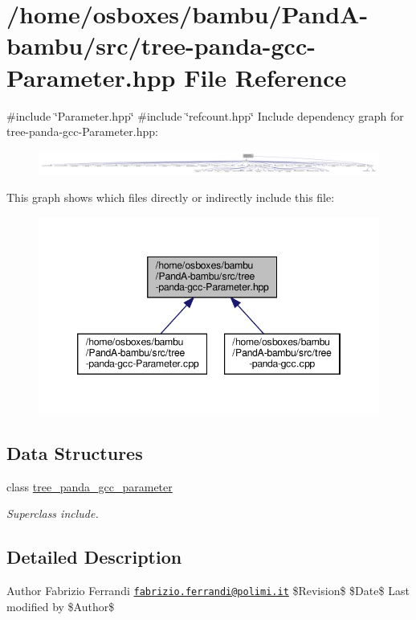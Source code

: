\hypertarget{tree-panda-gcc-Parameter_8hpp}{}\section{/home/osboxes/bambu/\+Pand\+A-\/bambu/src/tree-\/panda-\/gcc-\/\+Parameter.hpp File Reference}
\label{tree-panda-gcc-Parameter_8hpp}
{\ttfamily \#include \char`\"{}Parameter.\+hpp\char`\"{}}\newline
{\ttfamily \#include \char`\"{}refcount.\+hpp\char`\"{}}\newline
Include dependency graph for tree-\/panda-\/gcc-\/\+Parameter.hpp\+:
\nopagebreak
\begin{figure}[H]
\begin{center}
\leavevmode
\includegraphics[width=350pt]{dc/db7/tree-panda-gcc-Parameter_8hpp__incl}
\end{center}
\end{figure}
This graph shows which files directly or indirectly include this file\+:
\nopagebreak
\begin{figure}[H]
\begin{center}
\leavevmode
\includegraphics[width=346pt]{da/d90/tree-panda-gcc-Parameter_8hpp__dep__incl}
\end{center}
\end{figure}
\subsection*{Data Structures}
\begin{DoxyCompactItemize}
\item 
class \hyperlink{classtree__panda__gcc__parameter}{tree\+\_\+panda\+\_\+gcc\+\_\+parameter}
\begin{DoxyCompactList}\small\item\em Superclass include. \end{DoxyCompactList}\end{DoxyCompactItemize}


\subsection{Detailed Description}
\begin{DoxyAuthor}{Author}
Fabrizio Ferrandi \href{mailto:fabrizio.ferrandi@polimi.it}{\tt fabrizio.\+ferrandi@polimi.\+it} \$\+Revision\$ \$\+Date\$ Last modified by \$\+Author\$ 
\end{DoxyAuthor}
